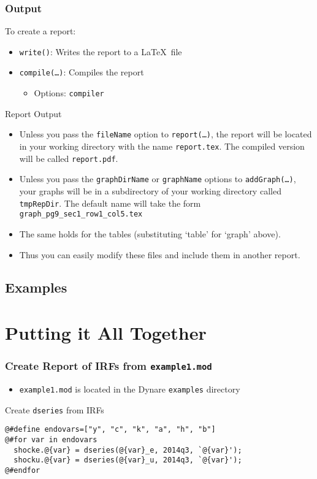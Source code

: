 \documentclass[10pt]{beamer}
\begin{document}
\begin{frame}
  \frametitle{Output}
  To create a report:
  \begin{itemize}
  \item \texttt{write()}: Writes the report to a \LaTeX\ file
  \item \texttt{compile(\ldots)}: Compiles the report
    \begin{itemize}
    \item Options: \texttt{compiler}
    \end{itemize}
  \end{itemize}
  Report Output
  \begin{itemize}
  \item Unless you pass the \texttt{fileName} option to \texttt{report(\ldots)}, the report will be located in your working directory with the name \texttt{report.tex}. The compiled version will be called \texttt{report.pdf}.
  \item Unless you pass the \texttt{graphDirName} or \texttt{graphName} options to \texttt{addGraph(\ldots)}, your graphs will be in a subdirectory of your working directory called \texttt{tmpRepDir}. The default name will take the form \texttt{graph\_pg9\_sec1\_row1\_col5.tex}
  \item The same holds for the tables (substituting `table' for `graph' above).
  \item Thus you can easily modify these files and include them in another report.
  \end{itemize}
\end{frame}


\subsection{Examples}

\section{Putting it All Together}
\begin{frame}[fragile=singleslide]
  \frametitle{Create Report of IRFs from \texttt{example1.mod}}
  \begin{itemize}
  \item \texttt{example1.mod} is located in the Dynare \texttt{examples} directory
  \end{itemize}
  \begin{block}{Create \texttt{dseries} from IRFs}
\begin{verbatim}
@#define endovars=["y", "c", "k", "a", "h", "b"]
@#for var in endovars
  shocke.@{var} = dseries(@{var}_e, 2014q3, `@{var}');
  shocku.@{var} = dseries(@{var}_u, 2014q3, `@{var}');
@#endfor
\end{verbatim}
  \end{block}
\end{frame}
\end{document}
